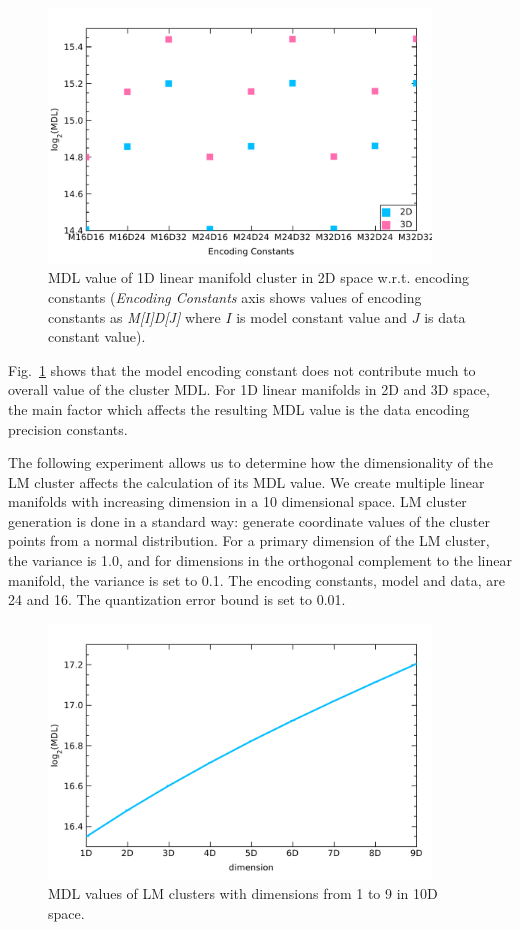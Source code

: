 \begin{figure}[H]
\center
\includegraphics[width=4in]{img/results_mdl-exp3_1.pdf}
\caption{MDL value of 1D linear manifold cluster in 2D space w.r.t. encoding constants (\emph{Encoding Constants} axis shows values of encoding constants as \emph{M[I]D[J]} where $I$ is model constant value and $J$ is data constant value).}
\label{fig:mdl-exp3}
\end{figure}



Fig.~\ref{fig:mdl-exp3} shows that the model encoding constant does not
contribute much to overall value of the cluster MDL. For 1D linear manifolds in
2D and 3D space, the main factor which affects the resulting MDL value is
the data encoding precision constants.
\bigskip
\fi

\ifIEEEtran
\else
The following experiment allows us to determine how the dimensionality of
the LM cluster affects the calculation of its MDL value. We create multiple
linear manifolds with increasing dimension in a 10 dimensional space. LM cluster
generation is done in a standard way: generate coordinate values of the cluster
points from a normal distribution. For a primary dimension of the LM cluster,
the variance is 1.0, and for dimensions in the orthogonal complement to
the linear manifold, the variance is set to 0.1. The encoding constants,
model and data, are 24 and 16. The quantization error bound is set to 0.01.

\begin{figure}[H]
\center
\includegraphics[width=4in]{img/results_mdl-exp4_1.pdf}
\caption{MDL values of LM clusters with dimensions from 1 to 9 in 10D space.}
\label{fig:mdl-exp4}
\end{figure}



